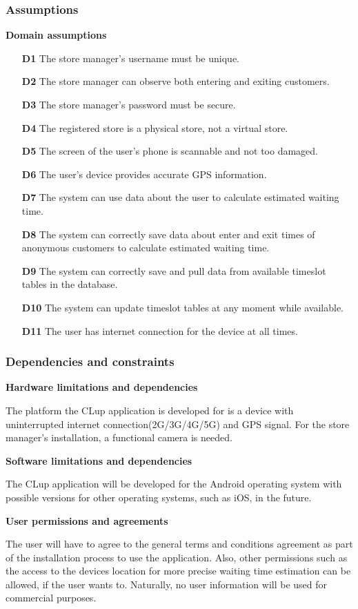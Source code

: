 \subsubsection{Assumptions}
\textbf{Domain assumptions}

\begin{itemize}
	\item[\textbf{D1}]The store manager's username must be unique. 
	\item[\textbf{D2}]The store manager can observe both entering and exiting customers.
	\item[\textbf{D3}]The store manager's password must be secure.
	\item[\textbf{D4}]The registered store is a physical store, not a virtual store.
	\item[\textbf{D5}]The screen of the user's phone is scannable and not too damaged.
	\item[\textbf{D6}]The user's device provides accurate GPS information. 
	\item[\textbf{D7}]The system can use data about the user to calculate estimated waiting time.
	\item[\textbf{D8}]The system can correctly save data about enter and exit times of anonymous customers to calculate estimated waiting time. 
	\item[\textbf{D9}]The system can correctly save and pull data from available timeslot tables in the database.
	\item[\textbf{D10}]The system can update timeslot tables at any moment while available. 
	\item[\textbf{D11}]The user has internet connection for the device at all times.
\end{itemize}

\subsubsection{Dependencies and constraints}
\hspace{\parindent}\textbf{Hardware limitations and dependencies}

\hspace{\parindent}The platform the CLup application is developed for is a device with uninterrupted internet connection(2G/3G/4G/5G) and GPS signal. For the store manager's installation, a functional camera is needed. \break

\textbf{Software limitations and dependencies}

\hspace{\parindent}The CLup application will be developed for the Android operating system with possible versions for other operating systems, such as iOS, in the future. \break

\textbf{User permissions and agreements}

\hspace{\parindent}The user will have to agree to the general terms and conditions agreement as part of the installation process to use the application. Also, other permissions such as the access to the devices location for more precise waiting time estimation can be allowed, if the user wants to. Naturally, no user information will be used for commercial purposes. 


